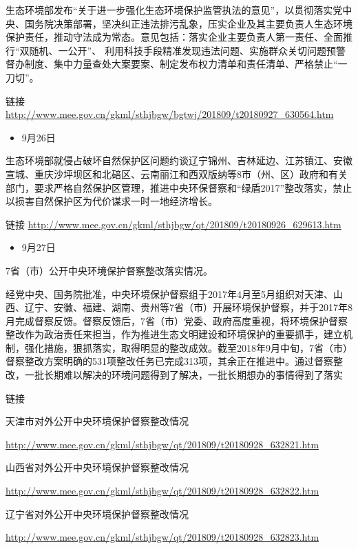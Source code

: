 \documentclass[]{book}
\providecommand{\tightlist}{%
  \setlength{\itemsep}{0pt}\setlength{\parskip}{0pt}}
\begin{document}
生态环境部发布``关于进一步强化生态环境保护监管执法的意见''，以贯彻落实党中央、国务院决策部署，坚决纠正违法排污乱象，压实企业及其主要负责人生态环境保护责任，推动守法成为常态。意见包括：落实企业主要负责人第一责任、全面推行``双随机、一公开''、
利用科技手段精准发现违法问题、实施群众关切问题预警督办制度、集中力量查处大案要案、制定发布权力清单和责任清单、严格禁止``一刀切''。

链接
\url{http://www.mee.gov.cn/gkml/sthjbgw/bgtwj/201809/t20180927_630564.htm}

\begin{itemize}
\tightlist
\item
  9月26日
\end{itemize}

生态环境部就侵占破坏自然保护区问题约谈辽宁锦州、吉林延边、江苏镇江、安徽宣城、重庆沙坪坝区和北碚区、云南丽江和西双版纳等8市（州、区）政府和有关部门，要求严格自然保护区管理，推进中央环保督察和``绿盾2017''整改落实，禁止以损害自然保护区为代价谋求一时一地经济增长。

链接
\url{http://www.mee.gov.cn/gkml/sthjbgw/qt/201809/t20180926_629613.htm}

\begin{itemize}
\tightlist
\item
  9月27日
\end{itemize}

7省（市）公开中央环境保护督察整改落实情况。

经党中央、国务院批准，中央环境保护督察组于2017年4月至5月组织对天津、山西、辽宁、安徽、福建、湖南、贵州等7省（市）开展环境保护督察，并于2017年8月完成督察反馈。督察反馈后，7省（市）党委、政府高度重视，将环境保护督察整改作为政治责任来担当，作为推进生态文明建设和环境保护的重要抓手，建立机制，强化措施，狠抓落实，取得明显的整改成效。截至2018年9月中旬，7省（市）督察整改方案明确的531项整改任务已完成313项，其余正在推进中。通过督察整改，一批长期难以解决的环境问题得到了解决，一批长期想办的事情得到了落实

链接

天津市对外公开中央环境保护督察整改情况

\url{http://www.mee.gov.cn/gkml/sthjbgw/qt/201809/t20180928_632821.htm}

山西省对外公开中央环境保护督察整改情况

\url{http://www.mee.gov.cn/gkml/sthjbgw/qt/201809/t20180928_632822.htm}

辽宁省对外公开中央环境保护督察整改情况

\url{http://www.mee.gov.cn/gkml/sthjbgw/qt/201809/t20180928_632823.htm}
\end{document}
